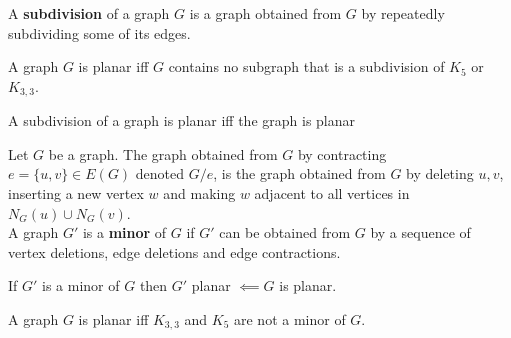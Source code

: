 \vspace{0.5cm}
\begin{definition}
    A \textbf{subdivision} of a graph $G$ is a graph obtained from $G$ by repeatedly subdividing some of its edges.
\end{definition}
\vspace{0.5cm}
\begin{theorem}
    A graph $G$ is planar iff $G$ contains no subgraph that is a subdivision of $K_5$ or $K_{3,3}$.
\end{theorem}
\begin{remark}
    A subdivision of a graph is planar iff the graph is planar
\end{remark}
\vspace{0.5cm}
\begin{definition}
    Let $G$ be a graph. The graph obtained from $G$ by contracting $e=\{u,v\}\in E(G)$ denoted $G/e$, is the graph obtained from $G$ by deleting $u,v$, inserting a new vertex $w$ and making $w$ adjacent to all vertices in $N_G(u)\cup N_G(v)$.\\
    A graph $G'$ is a \textbf{minor} of $G$ if $G'$ can be obtained from $G$ by a sequence of vertex deletions, edge deletions and edge contractions.
\end{definition}
\begin{remark}
    If $G'$ is a minor of $G$ then $G'$ planar $\impliedby G$ is planar.
\end{remark}
\vspace{0.5cm}
\begin{theorem}
    A graph $G$ is planar iff $K_{3,3}$ and $K_5$ are not a minor of $G$.
\end{theorem}